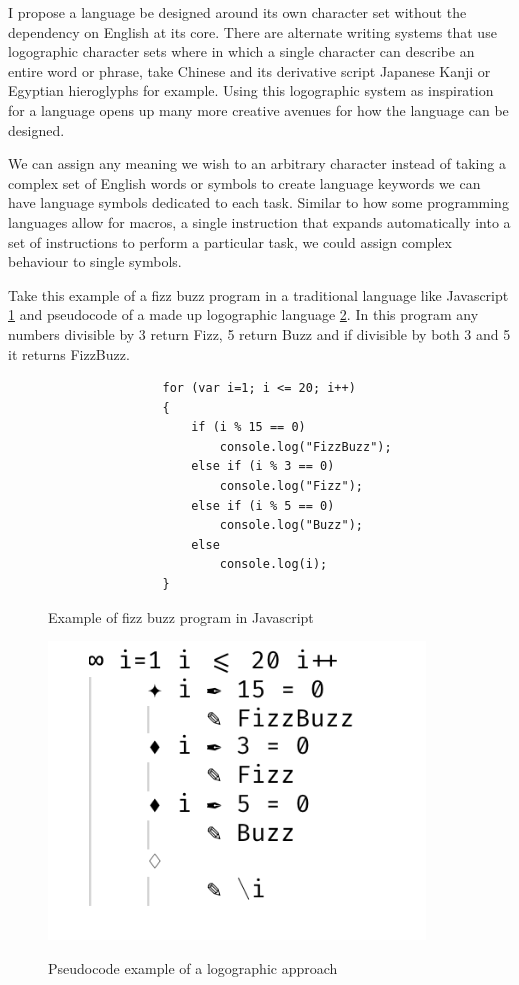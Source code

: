 \documentclass[12pt]{article}
\begin{document}
I propose a language be designed around its own character set without the dependency on English at its core.
There are alternate writing systems that use logographic character sets where in which a single
character can describe an entire word or phrase, take Chinese and its derivative script Japanese Kanji or Egyptian hieroglyphs for example.
Using this logographic system as inspiration for a language opens up many more creative
avenues for how the language can be designed. 

We can assign any meaning we wish to an arbitrary character
instead of taking a complex set of English words or symbols to create language keywords we can have language symbols dedicated to each task.
Similar to how some programming languages allow for macros, a single instruction that expands automatically into a set of instructions to perform a particular task,
we could assign complex behaviour to single symbols.

Take this example of a fizz buzz program in a traditional language like Javascript \ref{fig:javascript} and pseudocode of a made up logographic language \ref{fig:logographic}.
In this program any numbers divisible by 3 return Fizz, 5 return Buzz and if divisible by both 3 and 5 it returns FizzBuzz.

\begin{figure}[h]
    \caption{Example of fizz buzz program in Javascript}
    \centering
    \begin{verbatim}
                for (var i=1; i <= 20; i++)
                {
                    if (i % 15 == 0)
                        console.log("FizzBuzz");
                    else if (i % 3 == 0)
                        console.log("Fizz");
                    else if (i % 5 == 0)
                        console.log("Buzz");
                    else
                        console.log(i);
                }
    \end{verbatim}
    \label{fig:javascript}
\end{figure}
\begin{figure}[ht]
    \caption{Pseudocode example of a logographic approach}
    \centering
    \includegraphics[width=10cm]{logograph}
    \label{fig:logographic}
\end{figure}
\end{document}
